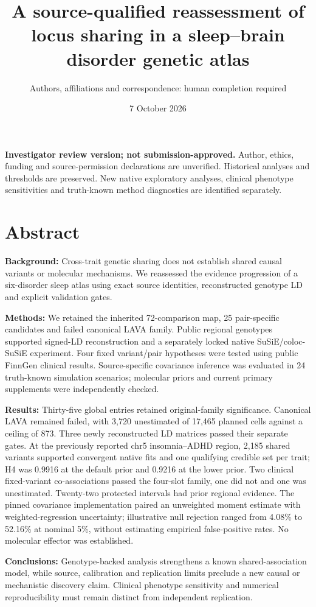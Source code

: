 \documentclass[11pt]{article}
\title{A source-qualified reassessment of locus sharing in a sleep--brain disorder genetic atlas}
\author{Authors, affiliations and correspondence: human completion required}
\date{7 October 2026}
\begin{document}
\maketitle
\textbf{Investigator review version; not submission-approved.} Author, ethics, funding and source-permission declarations are unverified. Historical analyses and thresholds are preserved. New native exploratory analyses, clinical phenotype sensitivities and truth-known method diagnostics are identified separately.

\section*{Abstract}
\textbf{Background:} Cross-trait genetic sharing does not establish shared causal variants or molecular mechanisms. We reassessed the evidence progression of a six-disorder sleep atlas using exact source identities, reconstructed genotype LD and explicit validation gates.

\textbf{Methods:} We retained the inherited 72-comparison map, 25 pair-specific candidates and failed canonical LAVA family. Public regional genotypes supported signed-LD reconstruction and a separately locked native SuSiE/coloc-SuSiE experiment. Four fixed variant/pair hypotheses were tested using public FinnGen clinical results. Source-specific covariance inference was evaluated in 24 truth-known simulation scenarios; molecular priors and current primary supplements were independently checked.

\textbf{Results:} Thirty-five global entries retained original-family significance. Canonical LAVA remained failed, with 3,720 unestimated of 17,465 planned cells against a ceiling of 873. Three newly reconstructed LD matrices passed their separate gates. At the previously reported chr5 insomnia--ADHD region, 2,185 shared variants supported convergent native fits and one qualifying credible set per trait; H4 was 0.9916 at the default prior and 0.9216 at the lower prior. Two clinical fixed-variant co-associations passed the four-slot family, one did not and one was unestimated. Twenty-two protected intervals had prior regional evidence. The pinned covariance implementation paired an unweighted moment estimate with weighted-regression uncertainty; illustrative null rejection ranged from 4.08\% to 52.16\% at nominal 5\%, without estimating empirical false-positive rates. No molecular effector was established.

\textbf{Conclusions:} Genotype-backed analysis strengthens a known shared-association model, while source, calibration and replication limits preclude a new causal or mechanistic discovery claim. Clinical phenotype sensitivity and numerical reproducibility must remain distinct from independent replication.
\end{document}
